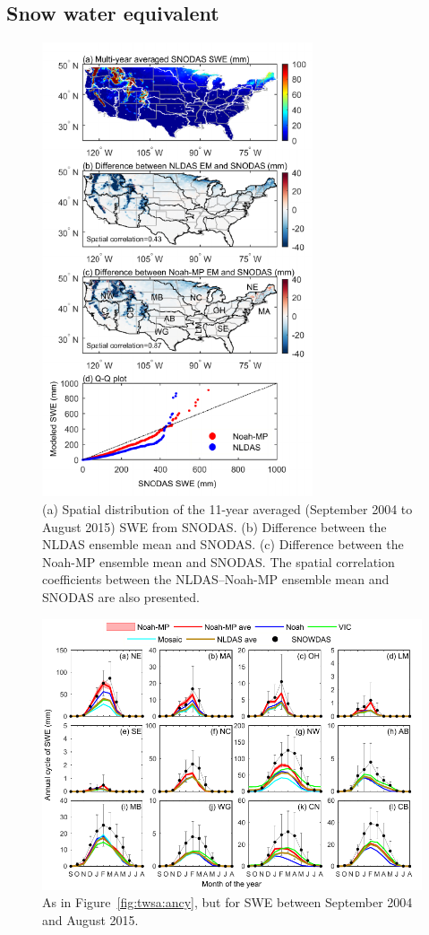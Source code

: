 \documentclass[essd, manuscript]{copernicus}
\begin{document}
\subsection{Snow water equivalent}\label{sec:results:swe}

\begin{figure}[t]
  \includegraphics[width=8cm]{fig/fig07.pdf}
  \caption{(a) Spatial distribution of the 11-year averaged (September 2004 to August 2015) SWE from SNODAS\@. (b) Difference between the NLDAS ensemble mean and SNODAS\@. (c) Difference between the Noah-MP ensemble mean and SNODAS\@. The spatial correlation coefficients between the NLDAS--Noah-MP ensemble mean and SNODAS are also presented.}
  \label{fig:swe:clim}
\end{figure}

\begin{figure}[t]
  \includegraphics[width=14cm]{fig/fig08.pdf}
  \caption{As in Figure~\ref{fig:twsa:ancy}, but for SWE between September 2004 and August 2015.}
  \label{fig:swe:ancy}
\end{figure}
\end{document}
